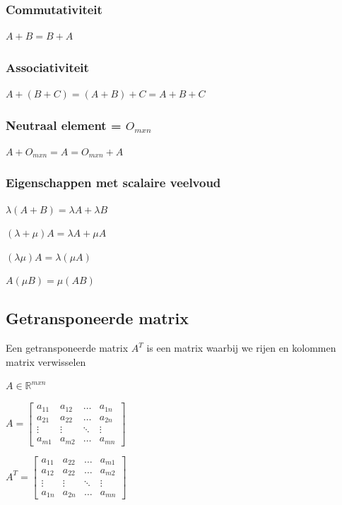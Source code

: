 \documentclass{article}
\begin{document}
\subsubsection{Commutativiteit}

$A + B = B + A$

\subsubsection{Associativiteit}

$A + (B + C) = (A + B) + C = A + B + C$

\subsubsection{Neutraal element = $O_{mxn}$}

$A + O_{mxn} = A = O_{mxn} + A$

\subsubsection{Eigenschappen met scalaire veelvoud}

$\lambda(A + B) = \lambda A + \lambda B$

$(\lambda + \mu)A = \lambda A + \mu A$

$(\lambda \mu)A = \lambda(\mu A)$

$A (\mu B) = \mu (AB)$

\subsection{Getransponeerde matrix}

Een getransponeerde matrix $A^T$ is een matrix waarbij we rijen en kolommen matrix verwisselen

$A \in \mathbb{R}^{mxn}$

$A = \begin{bmatrix}
    a_{11} & a_{12} & \dots & a_{1n}\\
    a_{21} & a_{22} & \dots & a_{2n}\\
    \vdots & \vdots & \ddots & \vdots\\
    a_{m1} & a_{m2} & \dots & a_{mn}
\end{bmatrix}$

$A^T = \begin{bmatrix}
    a_{11} & a_{22} & \dots & a_{m1}\\
    a_{12} & a_{22} & \dots & a_{m2}\\
    \vdots & \vdots & \ddots & \vdots\\
    a_{1n} & a_{2n} & \dots & a_{mn}
\end{bmatrix}$
\end{document}
